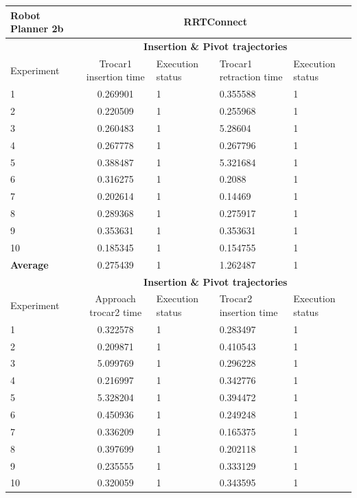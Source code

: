 \begin{longtable}{|p{2cm}|c|p{2cm}|p{2cm}|p{2cm}|}
\hline
Robot Planner 2b           & \multicolumn{4}{c}{\textbf{RRTConnect}}                                                                                                 \vline \\
\hline
                          & \multicolumn{4}{c}{\textbf{Insertion \& Pivot trajectories}}                     \vline \\
\hline
Experiment                & Trocar1 insertion time & Execution status & Trocar1 retraction time & Execution status  \\
\hline
1	& 0.269901	& 1	& 0.355588	& 1 \\
2	& 0.220509	& 1	& 0.255968	& 1 \\
3	& 0.260483	& 1	& 5.28604	& 1 \\
4	& 0.267778	& 1	& 0.267796	& 1 \\
5	& 0.388487	& 1	& 5.321684	& 1 \\
6	& 0.316275	& 1	& 0.2088	& 1 \\
7	& 0.202614	& 1	& 0.14469	& 1 \\
8	& 0.289368	& 1	& 0.275917	& 1 \\
9	& 0.353631	& 1	& 0.353631	& 1 \\
10	& 0.185345	& 1	& 0.154755	& 1 \\
\hline
\textbf{Average} & 0.275439 &	1	& 1.262487	& 1 \\
\hline
                          & \multicolumn{4}{c}{\textbf{Insertion \& Pivot trajectories}}                     \vline \\
\hline
Experiment                & Approach trocar2 time & Execution status & Trocar2 insertion time & Execution status  \\
\hline
1 & 0.322578	& 1	& 0.283497	& 1 \\
2 & 0.209871	& 1	& 0.410543	& 1 \\
3 & 5.099769	& 1	& 0.296228	& 1 \\
4 & 0.216997	& 1	& 0.342776	& 1 \\
5 & 5.328204	& 1	& 0.394472	& 1 \\
6 & 0.450936	& 1	& 0.249248	& 1 \\
7 & 0.336209	& 1	& 0.165375	& 1 \\
8 & 0.397699	& 1	& 0.202118	& 1 \\
9 & 0.235555	& 1	& 0.333129	& 1 \\
10  & 0.320059	& 1	& 0.343595	& 1 \\

\end{longtable}
